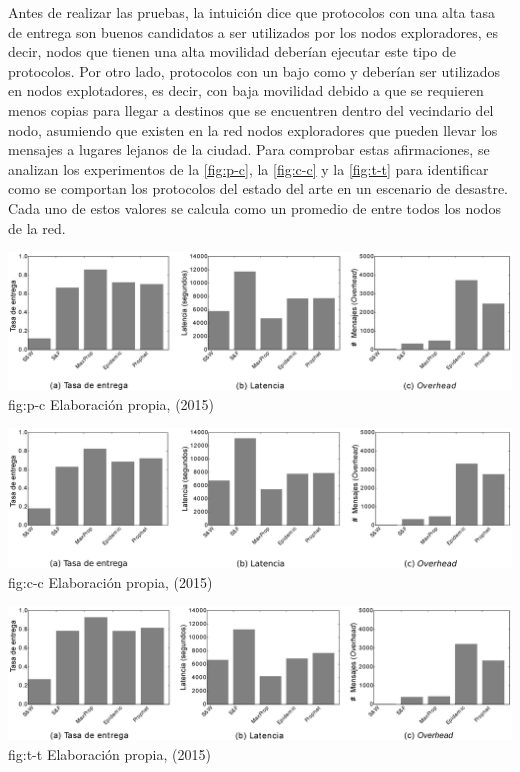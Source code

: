 Antes de realizar las pruebas, la intuición dice que protocolos con una alta
tasa de entrega son buenos candidatos a ser utilizados por los nodos
exploradores, es decir, nodos que tienen una alta movilidad deberían ejecutar
este tipo de protocolos. Por otro lado, protocolos con un bajo \overhead{} como
\syw{} y \syf{} deberían ser utilizados en nodos explotadores, es decir, con
baja movilidad debido a que se requieren menos copias para llegar a destinos que
se encuentren dentro del vecindario del nodo, asumiendo que existen en la red
nodos exploradores que pueden llevar los mensajes a lugares lejanos de la ciudad.
Para comprobar estas afirmaciones, se analizan los experimentos de la
\ref{fig:p-c}, la \ref{fig:c-c} y la \ref{fig:t-t} para identificar como se
comportan los protocolos del estado del arte en un escenario de desastre. Cada
uno de estos valores se calcula como un promedio de entre todos los nodos de la
red.



{\includegraphics[scale=0.27]{desarrollo/paper_pasado/graficos/clasicos_desde_personas.eps}}{fig:p-c}
{Elaboración propia, (2015)}


{\includegraphics[scale=0.27]{desarrollo/paper_pasado/graficos/clasicos_entre_centros.eps}}{fig:c-c}
{Elaboración propia, (2015)}


{\includegraphics[scale=0.27]{desarrollo/paper_pasado/graficos/clasicos_todos.eps}}{fig:t-t}
{Elaboración propia, (2015)}

